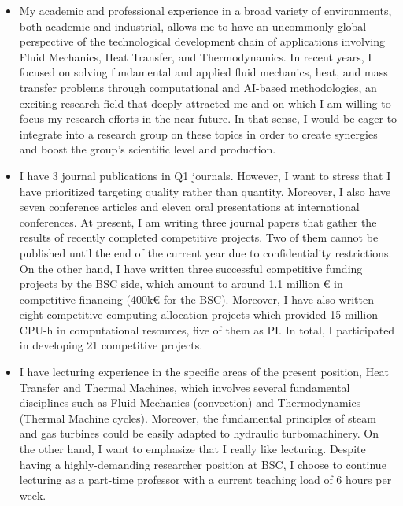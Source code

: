 \documentclass{article}
\begin{document}
\begin{itemize}
\item My academic and professional experience in a broad variety of environments, both academic and industrial, allows me to have an uncommonly global perspective of the technological development chain of applications involving Fluid Mechanics, Heat Transfer, and Thermodynamics. In recent years, I focused on solving fundamental and applied fluid mechanics, heat, and mass transfer problems through computational and AI-based methodologies, an exciting research field that deeply attracted me and on which I am willing to focus my research efforts in the near future. In that sense, I would be eager to integrate into a research group on these topics in order to create synergies and boost the group's scientific level and production. 

\item I have 3 journal publications in Q1 journals. However, I want to stress that I have prioritized targeting quality rather than quantity. Moreover, I also have seven conference articles and eleven oral presentations at international conferences. At present, I am writing three journal papers that gather the results of recently completed competitive projects. Two of them cannot be published until the end of the current year due to confidentiality restrictions. On the other hand, I have written three successful competitive funding projects by the BSC side, which amount to around 1.1 million € in competitive financing (400k€ for the BSC). Moreover, I have also written eight competitive computing allocation projects which provided 15 million CPU-h in computational resources, five of them as PI. In total, I participated in developing 21 competitive projects.

\item I have lecturing experience in the specific areas of the present position, Heat Transfer and Thermal Machines, which involves several fundamental disciplines such as Fluid Mechanics (convection) and Thermodynamics (Thermal Machine cycles). Moreover, the fundamental principles of steam and gas turbines could be easily adapted to hydraulic turbomachinery. On the other hand, I want to emphasize that I really like lecturing. Despite having a highly-demanding researcher position at BSC, I choose to continue lecturing as a part-time professor with a current teaching load of 6 hours per week.


\end{itemize}
\end{document}

